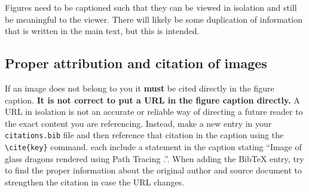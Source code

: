 Figures need to be captioned such that they can be viewed in isolation and still be meaningful to the viewer.
There will likely be some duplication of information that is written in the main text, but this is intended. 


	\subsection{Proper attribution and citation of images}
		\label{sec:typesetting_figures_citation}
		
If an image does not belong to you it \textbf{must} be cited directly in the figure caption. \textbf{It is not correct to put a URL in the figure caption directly.}
A URL in isolation is not an accurate or reliable way of directing a future reader to the exact content you are referencing.
Instead, make a new entry in your \lstinline|citations.bib| file and then reference that citation in the caption using the \lstinline|\cite{key}| command.
 each include a statement in the caption stating ``Image of glass dragons rendered using Path Tracing \cite{whittle15_dragons}.''.
When adding the Bib\TeX{} entry, try to find the proper information about the original author and source document to strengthen the citation in case the URL changes.
